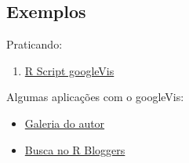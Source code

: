 

\subsection{Exemplos}

\begin{frame}

 Praticando:
  \begin{enumerate}
  \item \href{run:./R/googleVis/googleVis.R}{R Script googleVis}
  \end{enumerate}

  \vspace{0.5cm}
  Algumas aplicações com o googleVis:
  \begin{itemize}
  \item \href{http://cran.r-project.org/web/packages/googleVis/vignettes/}{Galeria
      do autor}
  \item \href{http://www.r-bloggers.com/?s=googleVis}{Busca no R
      Bloggers}
  \end{itemize}

\end{frame}
